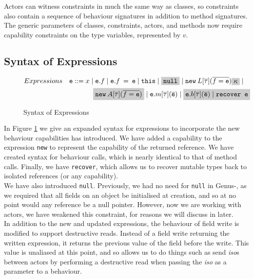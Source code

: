Actors can witness constraints in much the same way as classes, so constraints also contain a sequence of behaviour signatures in addition to method signatures. \\

The generic parameters of classes, constraints, actors, and methods now require capability constraints on the type variables, represented by $v$.

\subsection{Syntax of Expressions}

\begin{figure}[H]
    \centering
    \begin{align*}
        &Expressions & \texttt{e} &::= x \; | \; \texttt{e}.f \; | \; \texttt{e}.f \: = \: \texttt{e} \; | \; \texttt{this} \; | \; \highlight{\texttt{null}} \; | \; \texttt{new} \: L[\overline{\tau}]( \overline{f = \texttt{e}} ) \highlight{\kappa} \; | \\ & & &\quad\quad\quad \highlight{\texttt{new} \: A[\overline{\tau}]( \overline{f = \texttt{e}} )} \; | \; \texttt{e}.m[\overline{\tau}](\overline{\texttt{e}}) \;  | \; \highlight{\texttt{e}.b[\overline{\tau}](\overline{\texttt{e}}) \; | \; \texttt{recover e}} \\
    \end{align*}
    \caption{Syntax of Expressions}
    \label{fig:degen-expr}
\end{figure}

In Figure \ref{fig:degen-expr} we give an expanded syntax for expressions to incorporate the new behaviour capabilities has introduced. We have added a capability to the expression \texttt{new} to represent the capability of the returned reference. We have created syntax for behaviour calls, which is nearly identical to that of method calls. Finally, we have \texttt{recover}, which allows us to recover mutable types back to isolated references (or any capability). \\

We have also introduced \texttt{null}. Previously, we had no need for \texttt{null} in Genus-, as we required that all fields on an object be initialised at creation, and so at no point would any reference be a null pointer. However, now we are working with actors, we have weakened this constraint, for reasons we will discuss in later. \\

In addition to the new and updated expressions, the behaviour of field write is modified to support destructive reads. Instead of a field write returning the written expression, it returns the previous value of the field before the write. This value is unaliased at this point, and so allows us to do things such as send \textit{iso}s between actors by performing a destructive read when passing the \textit{iso} as a parameter to a behaviour. 

